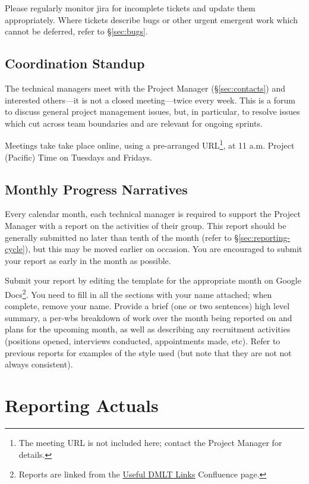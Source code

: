 Please regularly monitor \gls{jira} for incomplete tickets and update them appropriately.
Where tickets describe bugs or other urgent emergent work which cannot be deferred, refer to \S\ref{sec:bugs}.

\subsection{Coordination Standup}
\label{sec:sup}

The technical managers meet with the Project Manager (\S\ref{sec:contacts}) and interested others---it is not a closed meeting---twice every week.
This is a forum to discuss general project management issues, but, in particular, to resolve issues which cut across team boundaries and are relevant for ongoing sprints.

Meetings take take place online, using a pre-arranged URL\footnote{The meeting URL is not included here; contact the Project Manager for details.}, at 11 a.m. Project (Pacific) Time on Tuesdays and Fridays.

\subsection{Monthly Progress Narratives}
\label{sec:monthly-narrative}

Every calendar month, each technical manager is required to support the
Project Manager with a report on the activities of their group. This
report should be generally submitted no later than tenth of the month
(refer to \S\ref{sec:reporting-cycle}), but this may be moved earlier on
occasion. You are encouraged to submit your report as early in the month
as possible.

Submit your report by editing the template for the appropriate month on Google Docs\footnote{Reports are linked from the \href{https://confluence.lsstcorp.org/display/DM/Useful+DMLT+Links}{Useful DMLT Links} Confluence page.}.
You need to fill in all the sections with your name attached; when complete, remove your name.
Provide a brief (one or two sentences) high level summary, a per-\gls{wbs} breakdown of work over the month being reported on and plans for the upcoming month, as well as describing any recruitment activities (positions opened, interviews conducted, appointments made, etc).
Refer to previous reports for examples of the style used (but note that they are not not always consistent).

\section{Reporting Actuals}
\label{sec:actuals}

